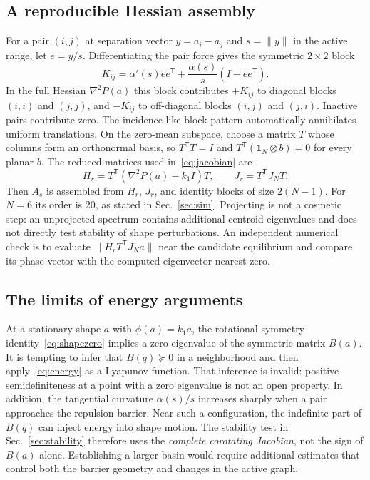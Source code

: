 \documentclass[conference]{IEEEtran}
\newcommand{\norm}[1]{\lVert#1\rVert}
\begin{document}
\subsection{A reproducible Hessian assembly}
For a pair $(i,j)$ at separation vector $y=a_i-a_j$ and $s=\norm y$ in the active range, let $e=y/s$. Differentiating the pair force gives the symmetric $2\times2$ block
\begin{equation}
 K_{ij}=\alpha'(s)ee^{\mathsf T}
 +\frac{\alpha(s)}{s}(I-ee^{\mathsf T}).
 \label{eq:edgehessian}
\end{equation}
In the full Hessian $\nabla^2P(a)$ this block contributes $+K_{ij}$ to diagonal blocks $(i,i)$ and $(j,j)$, and $-K_{ij}$ to off-diagonal blocks $(i,j)$ and $(j,i)$. Inactive pairs contribute zero. The incidence-like block pattern automatically annihilates uniform translations. On the zero-mean subspace, choose a matrix $T$ whose columns form an orthonormal basis, so $T^{\mathsf T}T=I$ and $T^{\mathsf T}(\mathbf1_N\otimes b)=0$ for every planar $b$. The reduced matrices used in~\eqref{eq:jacobian} are
\begin{equation}
 H_r=T^{\mathsf T}(\nabla^2P(a)-k_1I)T,
 \qquad J_r=T^{\mathsf T}J_NT.
 \label{eq:project}
\end{equation}
Then $A_s$ is assembled from $H_r$, $J_r$, and identity blocks of size $2(N-1)$. For $N=6$ its order is $20$, as stated in Sec.~\ref{sec:sim}. Projecting is not a cosmetic step: an unprojected spectrum contains additional centroid eigenvalues and does not directly test stability of shape perturbations. An independent numerical check is to evaluate $\norm{H_rT^{\mathsf T}J_Na}$ near the candidate equilibrium and compare its phase vector with the computed eigenvector nearest zero.

\subsection{The limits of energy arguments}
At a stationary shape $a$ with $\phi(a)=k_1a$, the rotational symmetry identity~\eqref{eq:shapezero} implies a zero eigenvalue of the symmetric matrix $B(a)$. It is tempting to infer that $B(q)\succeq0$ in a neighborhood and then apply~\eqref{eq:energy} as a Lyapunov function. That inference is invalid: positive semidefiniteness at a point with a zero eigenvalue is not an open property. In addition, the tangential curvature $\alpha(s)/s$ increases sharply when a pair approaches the repulsion barrier. Near such a configuration, the indefinite part of $B(q)$ can inject energy into shape motion. The stability test in Sec.~\ref{sec:stability} therefore uses the \emph{complete corotating Jacobian}, not the sign of $B(a)$ alone. Establishing a larger basin would require additional estimates that control both the barrier geometry and changes in the active graph.
\end{document}
